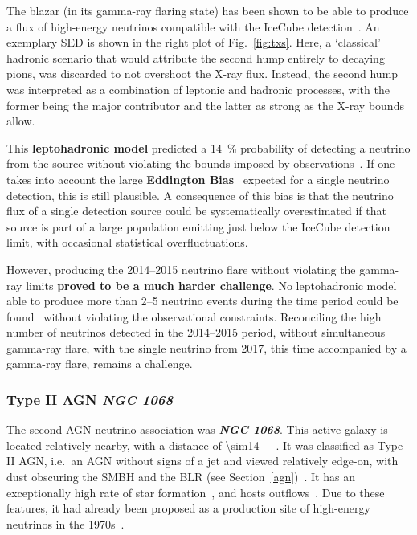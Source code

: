 The blazar (in its gamma-ray flaring state) has been shown to be able to produce a flux of high-energy neutrinos compatible with the IceCube detection~. An exemplary SED is shown in the right plot of Fig.~\ref{fig:txs}. Here, a `classical' hadronic scenario that would attribute the second hump entirely to decaying pions, was discarded to not overshoot the X-ray flux. Instead, the second hump was interpreted as a combination of leptonic and hadronic processes, with the former being the major contributor and the latter as strong as the X-ray bounds allow.

This \textbf{leptohadronic model} predicted a \SI{14}{\percent} probability of detecting a neutrino from the source without violating the bounds imposed by observations~\cite{Gao2018}. If one takes into account the large \textbf{Eddington Bias}~ expected for a single neutrino detection, this is still plausible. A consequence of this bias is that the neutrino flux of a single detection source could be systematically overestimated if that source is part of a large population emitting just below the IceCube detection limit, with occasional statistical overfluctuations.

However, producing the 2014--2015 neutrino flare without violating the gamma-ray limits \textbf{proved to be a much harder challenge}. No leptohadronic model able to produce more than 2--5 neutrino events during the time period could be found~ without violating the observational constraints. Reconciling the high number of neutrinos detected in the 2014--2015 period, without simultaneous gamma-ray flare, with the single neutrino from 2017, this time accompanied by a gamma-ray flare, remains a challenge.

\subsubsection{Type II AGN \emph{NGC 1068}}
The second AGN-neutrino association was \textbf{\emph{NGC 1068}}. This active galaxy is located relatively nearby, with a distance of \SI{\sim14}{\mega\parsec}~. It was classified as Type II AGN, i.e.\ an AGN without signs of a jet and viewed relatively edge-on, with dust obscuring the SMBH and the BLR (see Section~\ref{agn})~. It has an exceptionally high rate of star formation~, and hosts outflows~. Due to these features, it had already been proposed as a production site of high-energy neutrinos in the 1970s~.

